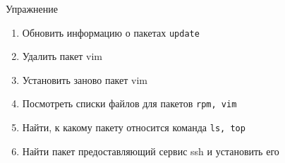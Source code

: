 \begin{frame}[fragile]{Упражнение}
  \begin{enumerate}
      \item Обновить информацию о пакетах {\tt update}
      \item Удалить пакет vim
      \item Установить заново пакет vim
      \item Посмотреть списки файлов для пакетов {\tt rpm, vim}
      \item Найти, к какому пакету относится команда {\tt ls, top}
      \item Найти пакет предоставляющий сервис ssh и установить его
    \end{enumerate}
\end{frame}


